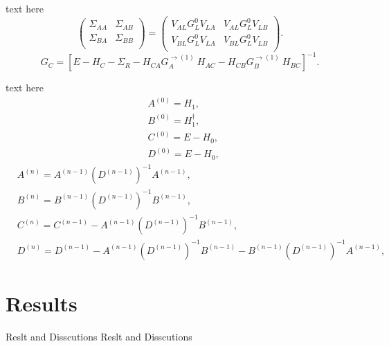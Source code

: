 \documentclass[handout,t]{beamer}
\begin{document}
\begin{frame}{text here}
	\begin{equation}
		\left( \begin{matrix}
			   {{\Sigma }_{AA}} & {{\Sigma }_{AB}}  \\
			   {{\Sigma }_{BA}} & {{\Sigma }_{BB}}  \\
			\end{matrix} \right)=\left( \begin{matrix}
			   {{V}_{AL}}G_{L}^{0}{{V}_{LA}} & {{V}_{AL}}G_{L}^{0}{{V}_{LB}}  \\
			   {{V}_{BL}}G_{L}^{0}{{V}_{LA}} & {{V}_{BL}}G_{L}^{0}{{V}_{LB}}  \\
			\end{matrix} 
		\right).
	\end{equation}
	\begin{equation}
		{{G}_{C}}={{\left[ E-{{H}_{C}}-{{\Sigma }_{R}}-{{H}_{CA}}G_{A}^{\to (1)}\ {{H}_{AC}}-{{H}_{CB}}G_{B}^{\to (1)}\ {{H}_{BC}} \right]}^{-1}}.
	\end{equation}
\end{frame}
\begin{frame}{text here}
	\begin{equation}
		\begin{aligned}
			&{{A}^{(0)}}={{H}_{1}},\\
			&{{B}^{(0)}}=H_{1}^{\dagger},\\
			&{{C}^{(0)}}=E-{{H}_{0}},\\
			&{{D}^{(0)}}=E-{{H}_{0}},
		\end{aligned}
	\end{equation}
	\begin{equation}
		\begin{aligned}
			&{{A}^{(n)}}={{A}^{(n-1)}}{{({{D}^{(n-1)}})}^{-1}}{{A}^{(n-1)}},\\
			&{{B}^{(n)}}={{B}^{(n-1)}}{{({{D}^{(n-1)}})}^{-1}}{{B}^{(n-1)}},\\
			&{{C}^{(n)}}={{C}^{(n-1)}}-{{A}^{(n-1)}}{{({{D}^{(n-1)}})}^{-1}}{{B}^{(n-1)}},\\
			&{{D}^{(n)}}={{D}^{(n-1)}}-{{A}^{(n-1)}}{{({{D}^{(n-1)}})}^{-1}}{{B}^{(n-1)}}-{{B}^{(n-1)}}{{({{D}^{(n-1)}})}^{-1}}{{A}^{(n-1)}},
		\end{aligned}
	\end{equation}

\end{frame}
\section{Results}
\begin{frame}{Reslt and Disscutions}
	Reslt and Disscutions
\end{frame}
\end{document}
